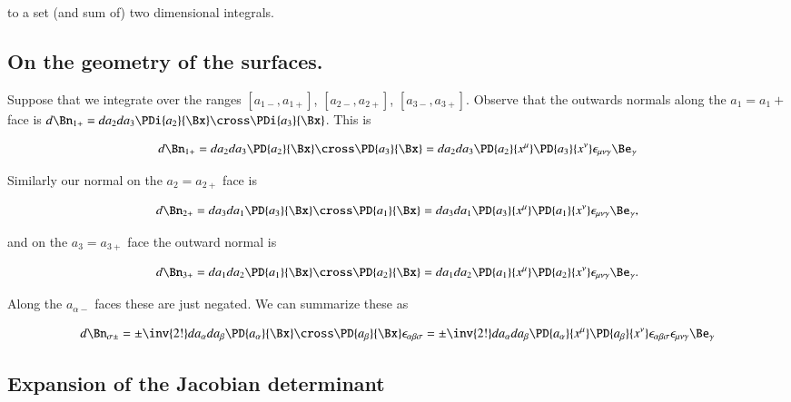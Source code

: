 to a set (and sum of) two dimensional integrals.

\subsection{On the geometry of the surfaces.}

Suppose that we integrate over the ranges $[a_{1-}, a_{1+}]$, $[a_{2-}, a_{2+}]$, $[a_{3-}, a_{3+}]$.  Observe that the outwards normals along the $a_1 = a_1+$ face is $d\Bn_{1+} = da_2 da_3 \PDi{a_2}{\Bx} \cross \PDi{a_3}{\Bx}$.  This is

\begin{equation}\label{eqn:relativisticElectrodynamicsPS6:440}
d\Bn_{1+} 
= da_2 da_3 \PD{a_2}{\Bx} \cross \PD{a_3}{\Bx}
= da_2 da_3 \PD{a_2}{x^\mu} \PD{a_3}{x^\nu} \epsilon_{\mu \nu \gamma} \Be_\gamma
\end{equation}

Similarly our normal on the $a_2 = a_{2+}$ face is

\begin{equation}\label{eqn:relativisticElectrodynamicsPS6:460}
d\Bn_{2+} 
= da_3 da_1 \PD{a_3}{\Bx} \cross \PD{a_1}{\Bx}
= da_3 da_1 \PD{a_3}{x^\mu} \PD{a_1}{x^\nu} \epsilon_{\mu \nu \gamma} \Be_\gamma,
\end{equation}

and on the $a_3 = a_{3+}$ face the outward normal is

\begin{equation}\label{eqn:relativisticElectrodynamicsPS6:480}
d\Bn_{3+} 
= da_1 da_2 \PD{a_1}{\Bx} \cross \PD{a_2}{\Bx}
= da_1 da_2 \PD{a_1}{x^\mu} \PD{a_2}{x^\nu} \epsilon_{\mu \nu \gamma} \Be_\gamma.
\end{equation}

Along the $a_{\alpha-}$ faces these are just negated.  We can summarize these as

\begin{equation}\label{eqn:relativisticElectrodynamicsPS6:500}
d\Bn_{\sigma\pm} 
= \pm \inv{2!} da_\alpha da_\beta \PD{a_\alpha}{\Bx} \cross \PD{a_\beta}{\Bx} \epsilon_{\alpha \beta \sigma}
= \pm \inv{2!} da_\alpha da_\beta \PD{a_\alpha}{x^\mu} \PD{a_\beta}{x^\nu} \epsilon_{\alpha \beta \sigma} \epsilon_{\mu \nu \gamma} \Be_\gamma 
\end{equation}

\subsection{Expansion of the Jacobian determinant}

